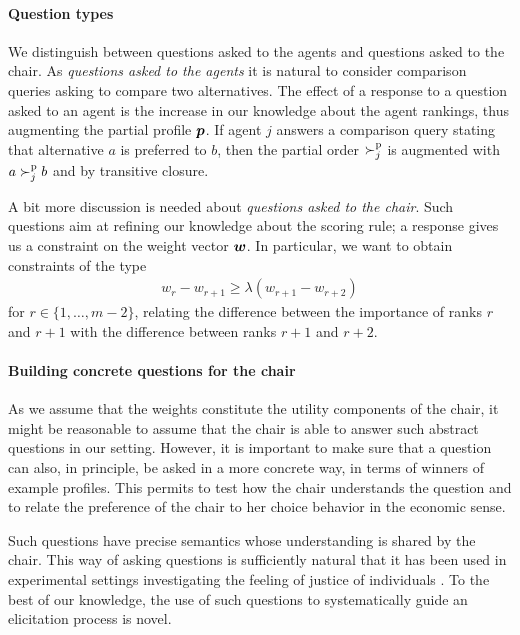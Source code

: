 \documentclass{article}
\begin{document}
\paragraph{Question types}
We distinguish between questions asked to the agents and questions asked to the chair.
As {\em questions asked to the agents} it is natural to consider comparison queries asking to compare two alternatives.
The effect of a response to a question asked to an agent is the increase in our knowledge about the agent rankings, thus augmenting the partial profile ${\bm{p}}$. 
If agent $j$ answers a comparison query stating that alternative $a$ is preferred to $b$, then the partial order $\succ^\text{p}_j$ is augmented with $a \succ^\text{p}_j b$ and by transitive closure.

A bit more discussion is needed about {\em questions asked to the chair}.
Such questions aim at refining our knowledge about the scoring rule; a response gives us a constraint on the weight vector $\bm{w}$.
In particular, we want to obtain constraints of the type
\begin{align}
	w_{r} - w_{r+1} \geq \lambda (w_{r+1} - w_{r+2})
\end{align}
for $r \in \{1,\ldots,m-2\}$, relating the difference between the importance of ranks $r$ and $r+1$ with the difference between ranks $r+1$ and $r+2$.

\paragraph{Building concrete questions for the chair}
As we assume that the weights constitute the utility components of the chair, it might be reasonable to assume that the chair is able to answer such abstract questions in our setting. However, it is important to make sure that a question can also, in principle, be asked in a more concrete way, in terms of winners of example profiles. This permits to test how the chair understands the question and to relate the preference of the chair to her choice behavior in the economic sense. 

Such questions have precise semantics whose understanding is shared by the chair. This way of asking questions is sufficiently natural that it has been used in experimental settings investigating the feeling of justice of individuals \citep{Giritligil2005}. To the best of our knowledge, the use of such questions to systematically guide an elicitation process is novel.
\end{document}
